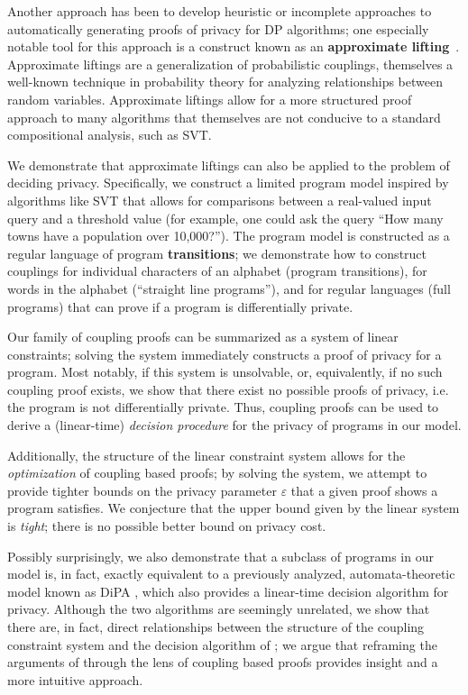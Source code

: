 Another approach has been to develop heuristic or incomplete approaches to automatically generating proofs of privacy for DP algorithms; one especially notable tool for this approach is a construct known as an 
\textbf{approximate lifting}~\cite{bartheProvingDifferentialPrivacy2016,bartheDifferentialPrivacyComposition2013,hsuProbabilisticCouplingsProbabilistic2017,albarghouthiConstraintBasedSynthesisCoupling2018,albarghouthiSynthesizingCouplingProofs2017}. 
Approximate liftings are a generalization of probabilistic couplings, themselves a well-known technique in probability theory for analyzing relationships between random variables.
Approximate liftings allow for a more structured proof approach to many algorithms that themselves are not conducive to a standard compositional analysis, such as SVT.

We demonstrate that approximate liftings can also be applied to the problem of deciding privacy. Specifically, we construct a limited program model inspired by algorithms like SVT that allows for comparisons between a real-valued input query and a threshold value (for example, one could ask the query ``How many towns have a population over 10,000?'').
The program model is constructed as a regular language of program \textbf{transitions}; we demonstrate how to construct couplings for individual characters of an alphabet (program transitions), for words in the alphabet (``straight line programs''), and for regular languages (full programs) that can prove if a program is differentially private. 

Our family of coupling proofs can be summarized as a system of linear constraints; solving the system immediately constructs a proof of privacy for a program. Most notably, if this system is unsolvable, or, equivalently, if no such coupling proof exists, we show that there exist no possible proofs of privacy, i.e. the program is not differentially private. Thus, coupling proofs can be used to derive a (linear-time) \textit{decision procedure} for the privacy of programs in our model. 

Additionally, the structure of the linear constraint system allows for the \textit{optimization} of coupling based proofs; by solving the system, we attempt to provide tighter bounds on the privacy parameter $\varepsilon$ that a given proof shows a program satisfies. 
We conjecture that the upper bound given by the linear system is \textit{tight}; there is no possible better bound on privacy cost. 

Possibly surprisingly, we also demonstrate that a subclass of programs in our model is, in fact, exactly equivalent to a previously analyzed, automata-theoretic model known as DiPA \cite{chadhaLinearTimeDecidability2021}, which also provides a linear-time decision algorithm for privacy. 
Although the two algorithms are seemingly unrelated, we show that there are, in fact, direct relationships between the structure of the coupling constraint system and the decision algorithm of \cite{chadhaLinearTimeDecidability2021}; we argue that reframing the arguments of \cite{chadhaLinearTimeDecidability2021} through the lens of coupling based proofs provides insight and a more intuitive approach. 

